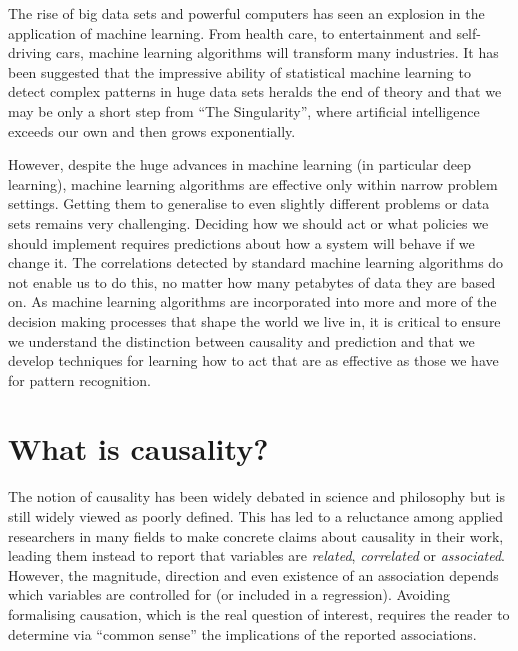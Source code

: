 \documentclass[11pt,a4paper,twoside]{report}
\newcommand{\quotes}[1]{``#1''}
\theoremstyle{plain}
\theoremstyle{definition}
\begin{document}
The rise of big data sets and powerful computers has seen an explosion in the application of machine learning. From health care, to entertainment and self-driving cars, machine learning algorithms will transform many industries. It has been suggested that the impressive ability of statistical machine learning to detect complex patterns in huge data sets heralds the end of theory \citep{anderson2008end} and that we may be only a short step from \quotes{The Singularity}, where artificial intelligence exceeds our own and then grows exponentially. 

However, despite the huge advances in machine learning (in particular deep learning), machine learning algorithms are effective only within narrow problem settings. Getting them to generalise to even slightly different problems or data sets remains very challenging. Deciding how we should act or what policies we should implement requires predictions about how a system will behave if we change it. The correlations detected by standard machine learning algorithms do not enable us to do this, no matter how many petabytes of data they are based on. As machine learning algorithms are incorporated into more and more of the decision making processes that shape the world we live in, it is critical to ensure we understand the distinction between causality and prediction and that we develop techniques for learning how to act that are as effective as those we have for pattern recognition.


\section{What is causality? }

The notion of causality has been widely debated in science and philosophy \citep{hume1741treatise,mill1893system,pearson1911grammar,Pearl2000,Lewis2000,woodward2005making,heckman20051,cartwright2007hunting} but is still widely viewed as poorly defined. This has led to a reluctance among applied researchers in many fields to make concrete claims about causality in their work, leading them instead to report that variables are \textit{related}, \textit{correlated} or \textit{associated}. However, the magnitude, direction and even existence of an association depends which variables are controlled for (or included in a regression). Avoiding formalising causation, which is the real question of interest, requires the reader to determine via \quotes{common sense} the implications of the reported associations.
\end{document}
